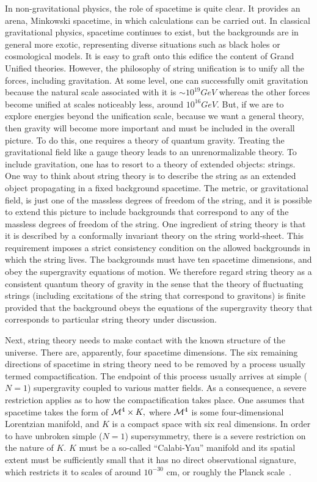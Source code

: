 \documentclass{article}
\begin{document}
In non-gravitational physics, the role of spacetime is quite clear. It
provides an arena, Minkowski spacetime, in which calculations can be
carried out. In classical gravitational physics, spacetime continues to
exist, but the backgrounds are in general more exotic, representing
diverse situations such as black holes or cosmological models.  It is
easy to graft onto this edifice the content of Grand Unified
theories. However, the philosophy of string unification is to unify all
the forces, including gravitation. At some level, one can successfully
omit gravitation because the natural scale associated with it is $\sim
10^{19} GeV$ whereas the other forces become unified at scales
noticeably less, around $10^{16} GeV$. But, if we are to explore
energies beyond the unification scale, because we want a general theory,
then gravity will become more important and must be included in the
overall picture. To do this, one requires a theory of quantum
gravity. Treating the gravitational field like a gauge theory leads to
an unrenormalizable theory.  To include gravitation, one has to resort
to a theory of extended objects: strings. One way to think about string
theory is to describe the string as an extended object propagating in a
fixed background spacetime.  The metric, or gravitational field, is just
one of the massless degrees of freedom of the string, and it is possible
to extend this picture to include backgrounds that correspond to any of
the massless degrees of freedom of the string. One ingredient of string
theory is that it is described by a conformally invariant theory on the
string world-sheet. This requirement imposes a strict consistency
condition on the allowed backgrounds in which the string lives. The
backgrounds must have ten spacetime dimensions, and obey the
supergravity equations of motion.  We therefore regard string theory as
a consistent quantum theory of gravity in the sense that the theory of
fluctuating strings (including excitations of the string that correspond
to gravitons) is finite provided that the background obeys the equations
of the supergravity theory that corresponds to particular string theory
under discussion.

Next, string theory needs to make contact with the known structure of
the universe. There are, apparently, four spacetime dimensions.
The six remaining directions of spacetime in string theory need to be
removed by a process usually termed compactification. The endpoint of
this process usually arrives at simple ($N=1$) supergravity
coupled to various matter fields.
As a consequence, a severe restriction applies as to how
the compactification takes place. One assumes that spacetime takes
the form of ${\cal M}^4\times K,$ where ${\cal M}^4$ is some
four-dimensional Lorentzian  manifold, and $K$ is a compact space with
six real dimensions. In order to have unbroken simple ($N=1$) supersymmetry,
there is a severe restriction on the nature of $K$.
$K$ must be a so-called ``Calabi-Yau'' manifold and its
spatial extent must be sufficiently
small that it has no direct observational signature,
which restricts it to
scales of around $10^{-30}$ cm, or roughly the Planck scale~\cite{W:cy}.
\end{document}
